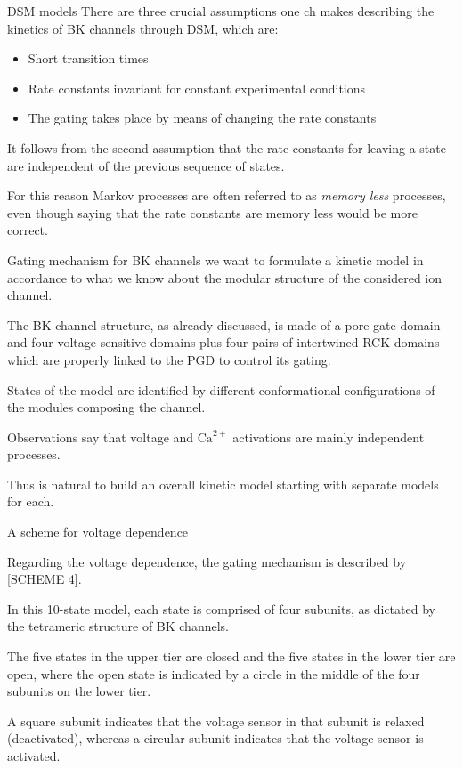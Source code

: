 \documentclass[t]{beamer}
\newcommand{\ca}{\text{Ca}^{2+}}
\begin{document}
\begin{frame}{DSM models}
    There are three crucial assumptions one ch makes describing the kinetics of BK channels through DSM, which are:
    \begin{itemize}
      \item Short transition times
      \item Rate constants invariant for constant experimental conditions
      \item The gating takes place by means of changing the rate constants
    \end{itemize}
    
    It follows from the second assumption that the rate constants for leaving a state are independent of the previous sequence of states.

    For this reason Markov processes are often referred to as \emph{memory less} processes, even though saying that the rate constants are memory less would be more correct.

\end{frame}


\begin{frame}{Gating mechanism for BK channels}
we want to formulate a kinetic model in accordance to what we know about the modular structure of the considered ion channel.

The BK channel structure, as already discussed, is made of a pore gate domain and four voltage sensitive domains plus four pairs of intertwined RCK domains which are properly linked to the PGD to control its gating.

States of the model are identified by different conformational configurations of the modules composing the channel.

Observations say that voltage and $\ca$ activations are mainly independent processes.

Thus is natural to build an overall kinetic model starting with separate models for each.

\end{frame}

\begin{frame}{A scheme for voltage dependence}

Regarding the voltage dependence, the gating mechanism is described by [SCHEME 4].

In this 10-state model, each state is comprised of four subunits, as dictated by the tetrameric structure of BK channels.

The five states in the upper tier are closed and the five states in the lower tier are open, where the open state is indicated by a circle in the middle of the four subunits on the lower tier.

A square subunit indicates that the voltage sensor in that subunit is relaxed (deactivated), whereas a circular subunit indicates that the voltage sensor is activated.
\end{frame}
\end{document}
